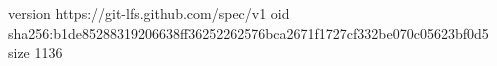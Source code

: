 version https://git-lfs.github.com/spec/v1
oid sha256:b1de85288319206638ff36252262576bca2671f1727cf332be070c05623bf0d5
size 1136
